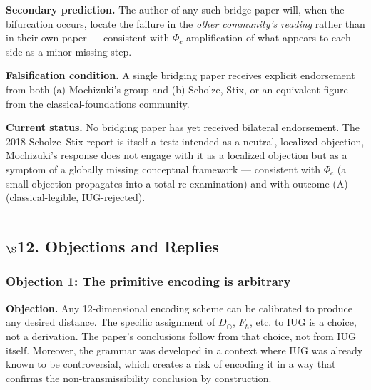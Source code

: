 \documentclass[10pt,a4paper]{article}
\begin{document}
\textbf{Secondary prediction.} The author of any such bridge paper will, when the bifurcation
occurs, locate the failure in the \emph{other community's reading} rather than in their own paper
--- consistent with $\Phi_c$ amplification of what appears to each side as a minor missing step.

\textbf{Falsification condition.} A single bridging paper receives explicit endorsement from both
(a) Mochizuki's group and (b) Scholze, Stix, or an equivalent figure from the
classical-foundations community.

\textbf{Current status.} No bridging paper has yet received bilateral endorsement. The 2018
Scholze--Stix report is itself a test: intended as a neutral, localized objection, Mochizuki's
response does not engage with it as a localized objection but as a symptom of a globally
missing conceptual framework --- consistent with $\Phi_c$ (a small objection propagates into a
total re-examination) and with outcome (A) (classical-legible, IUG-rejected).

\begin{center}
\rule{0.5\textwidth}{0.4pt}
\end{center}

\subsection{$\S$12. Objections and Replies}

\subsubsection{Objection 1: The primitive encoding is arbitrary}

\textbf{Objection.} Any 12-dimensional encoding scheme can be calibrated to produce any desired
distance. The specific assignment of $D_\odot$, $F_{\hbar}$, etc. to IUG is a choice,
not a derivation. The paper's conclusions follow from that choice, not from IUG itself.
Moreover, the grammar was developed in a context where IUG was already known to be
controversial, which creates a risk of encoding it in a way that confirms the
non-transmissibility conclusion by construction.
\end{document}
